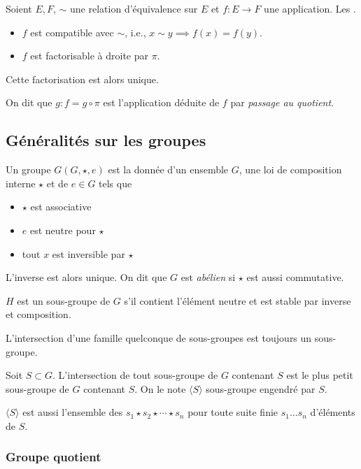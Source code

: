 \documentclass[a4paper,11pt,twocolumn]{article}\usepackage[landscape]{geometry}
\begin{document}
     Soient $E,F$, $\sim$ une relation d'équivalence sur $E$ et $f:E\rightarrow F$ une application. Les \Asse{}.
    \begin{itemize}
      \item $f$ est compatible avec $\sim$, i.e., $x\sim y \implies f(x)=f(y)$.
      \item $f$ est factorisable à droite par $\pi$.
    \end{itemize}

    Cette factorisation est alors unique.

     On dit que $g: f=g\circ\pi$ est l'application déduite de $f$ par \emph{passage au quotient}.

  \subsection{Généralités sur les groupes}

     Un groupe $G (G,\star,e)$ est la donnée d'un ensemble $G$, une loi de composition interne $\star$ et de $e\in G$ tels que
    \begin{itemize}
      \item $\star$ est associative
      \item $e$ est neutre pour $\star$
      \item tout $x$ est inversible par $\star$
    \end{itemize}
    L'inverse est alors unique. On dit que $G$ est \emph{abélien} si $\star$ est aussi commutative.

     $H$ est un sous-groupe de $G$ s'il contient l'élément neutre et est stable par inverse et composition.

     L'intersection d'une famille quelconque de sous-groupes est toujours un sous-groupe.

     Soit $S\subset G$. L'intersection de tout sous-groupe de $G$ contenant $S$ est le plus petit sous-groupe de $G$ contenant $S$. On le note $\langle S\rangle$ sous-groupe engendré par $S$.

    $\langle S\rangle$ est aussi l'ensemble des $s_1\star s_2\star\cdots\star s_n$ pour toute suite finie $s_1\ldots s_n$ d'éléments de $S$.

    \subsubsection{Groupe quotient}
\end{document}
